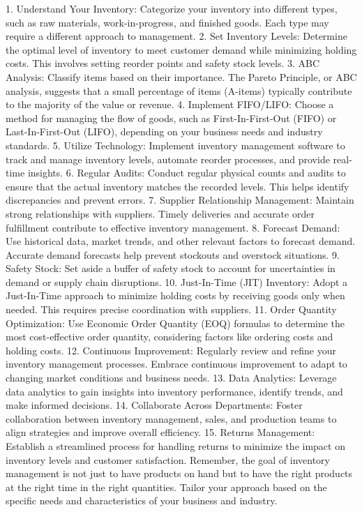 1. Understand Your Inventory:
Categorize your inventory into different types, such as raw materials, work-in-progress, and finished goods. Each type may require a different approach to management.
2. Set Inventory Levels:
Determine the optimal level of inventory to meet customer demand while minimizing holding costs. This involves setting reorder points and safety stock levels.
3. ABC Analysis:
Classify items based on their importance. The Pareto Principle, or ABC analysis, suggests that a small percentage of items (A-items) typically contribute to the majority of the value or revenue.
4. Implement FIFO/LIFO:
Choose a method for managing the flow of goods, such as First-In-First-Out (FIFO) or Last-In-First-Out (LIFO), depending on your business needs and industry standards.
5. Utilize Technology:
Implement inventory management software to track and manage inventory levels, automate reorder processes, and provide real-time insights.
6. Regular Audits:
Conduct regular physical counts and audits to ensure that the actual inventory matches the recorded levels. This helps identify discrepancies and prevent errors.
7. Supplier Relationship Management:
Maintain strong relationships with suppliers. Timely deliveries and accurate order fulfillment contribute to effective inventory management.
8. Forecast Demand:
Use historical data, market trends, and other relevant factors to forecast demand. Accurate demand forecasts help prevent stockouts and overstock situations.
9. Safety Stock:
Set aside a buffer of safety stock to account for uncertainties in demand or supply chain disruptions.
10. Just-In-Time (JIT) Inventory:
Adopt a Just-In-Time approach to minimize holding costs by receiving goods only when needed. This requires precise coordination with suppliers.
11. Order Quantity Optimization:
Use Economic Order Quantity (EOQ) formulas to determine the most cost-effective order quantity, considering factors like ordering costs and holding costs.
12. Continuous Improvement:
Regularly review and refine your inventory management processes. Embrace continuous improvement to adapt to changing market conditions and business needs.
13. Data Analytics:
Leverage data analytics to gain insights into inventory performance, identify trends, and make informed decisions.
14. Collaborate Across Departments:
Foster collaboration between inventory management, sales, and production teams to align strategies and improve overall efficiency.
15. Returns Management:
Establish a streamlined process for handling returns to minimize the impact on inventory levels and customer satisfaction.
Remember, the goal of inventory management is not just to have products on hand but to have the right products at the right time in the right quantities. Tailor your approach based on the specific needs and characteristics of your business and industry.

